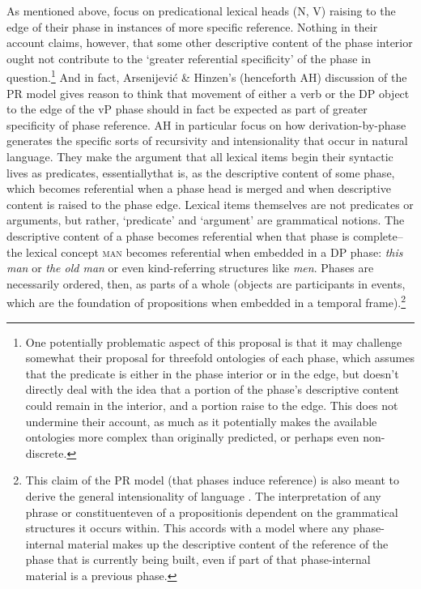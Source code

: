 \documentclass[output=paper
,modfonts
,nonflat
]{langsci/langscibook}
\begin{document}
As mentioned above, \citet{SheehanHinzen:2011} focus on predicational lexical heads (N, V) raising to the edge of their phase in instances of more specific reference. Nothing in their account claims, however, that some other descriptive content of the phase interior ought not contribute to the `greater referential specificity' of the phase in question.\footnote{One potentially problematic aspect of this proposal is that it may challenge somewhat their proposal for threefold ontologies of each phase, which assumes that the predicate is either in the phase interior or in the edge, but doesn’t directly deal with the idea that a portion of the phase's descriptive content could remain in the interior, and a portion raise to the edge. This does not undermine their account, as much as it potentially makes the available ontologies more complex than originally predicted, or perhaps even non-discrete.}  And in fact, Arsenijevi{\'c} \& Hinzen's \citeyear{ArsenijevicHinzen:2012} (henceforth AH) discussion of the PR model gives reason to think that movement of either a verb or the DP object to the edge of the vP phase should in fact be expected as part of greater specificity of phase reference. AH in particular focus on how derivation-by-phase generates the specific sorts of recursivity and intensionality that occur in natural language. They make the argument that all lexical items begin their syntactic lives as predicates, essentially\textemdash that is, as the descriptive content of some phase, which becomes referential when a phase head is merged and when descriptive content is raised to the phase edge. Lexical items themselves are not predicates or arguments, but rather, `predicate' and `argument' are grammatical notions. The descriptive content of a phase becomes referential when that phase is complete–the lexical concept \textsc{man} becomes referential when embedded in a DP phase: \textit{this man} or \textit{the old man} or even kind-referring structures like \textit{men}. Phases are necessarily ordered, then, as parts of a whole (objects are participants in events, which are the foundation of propositions when embedded in a temporal frame).\footnote{This claim of the PR model (that phases induce reference) is also meant to derive the general intensionality of language \citep{Hinzen:2014b,ArsenijevicHinzen:2012,HinzenSheehan:2013}. The interpretation of any phrase or constituent\textemdash even of a proposition\textemdash is dependent on the grammatical structures it occurs within. This accords with a model where any phase-internal material makes up the descriptive content of the reference of the phase that is currently being built, even if part of that phase-internal material is a previous phase.} 
\end{document}
